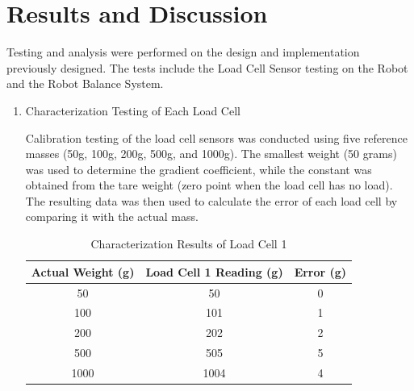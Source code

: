 \section{Results and Discussion}
\label{sec:resultsanddiscussion}

Testing and analysis were performed on the design and implementation previously designed. The tests include the Load Cell Sensor testing on the Robot and the Robot Balance System.

\begin{enumerate}[label=\Alph*.]

    \item Characterization Testing of Each Load Cell
    \label{subsec:results-discussion-characterization}

        \hspace*{1em} Calibration testing of the load cell sensors was conducted using five reference masses (50g, 100g, 200g, 500g, and 1000g). The smallest weight (50 grams) was used to determine the gradient coefficient, while the constant was obtained from the tare weight (zero point when the load cell has no load). The resulting data was then used to calculate the error of each load cell by comparing it with the actual mass.

        \begin{table}[h!]
            \centering
            \caption{Characterization Results of Load Cell 1}
            \begin{tabular}{|c|c|c|}
                \hline
                \textbf{Actual Weight (g)} & \textbf{Load Cell 1 Reading (g)} & \textbf{Error (g)} \\
                \hline
                50    & 50    & 0   \\
                100   & 101   & 1   \\
                200   & 202   & 2   \\
                500   & 505   & 5   \\
                1000  & 1004  & 4   \\
                \hline
            \end{tabular}
            \label{tab:Calibration_Load_Cell_1}
        \end{table}


\end{enumerate}
